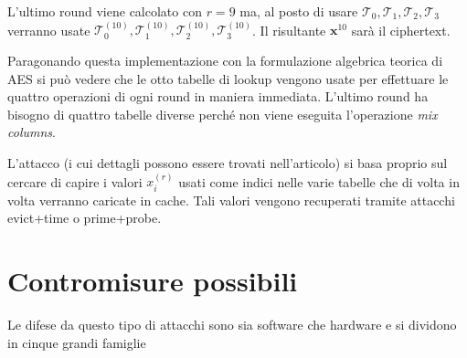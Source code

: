 				L'ultimo round viene calcolato con $r = 9$ ma, al posto di usare $\mathcal{T}_0, \mathcal{T}_1, \mathcal{T}_2, \mathcal{T}_3$ verranno usate $\mathcal{T}_{0}^{(10)}, \mathcal{T}_{1}^{(10)}, \mathcal{T}_{2}^{(10)}, \mathcal{T}_{3}^{(10)}$. Il risultante $\mathbf{x}^{10}$ sarà il ciphertext.
				
				Paragonando questa implementazione con la formulazione algebrica teorica di \ac{AES} si può vedere che le otto tabelle di lookup vengono usate per effettuare le quattro operazioni di ogni round in maniera immediata. L'ultimo round ha bisogno di quattro tabelle diverse perché non viene eseguita l'operazione \emph{mix columns}.
				
				L'attacco (i cui dettagli possono essere trovati nell'articolo) si basa proprio sul cercare di capire i valori $x_{i}^{(r)}$ usati come indici nelle varie tabelle che di volta in volta verranno caricate in cache. Tali valori vengono recuperati tramite attacchi evict+time o prime+probe.
		
		\section{Contromisure possibili}
			Le difese da questo tipo di attacchi sono sia software che hardware e si dividono in cinque grandi famiglie\cite{ge2016survey}
			
